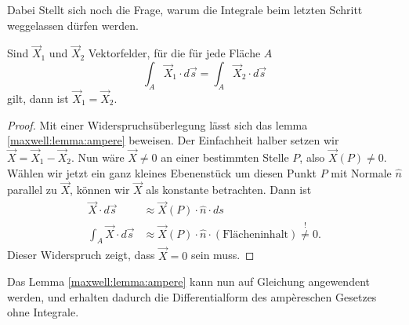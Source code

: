 Dabei Stellt sich noch die Frage, warum die Integrale beim letzten Schritt weggelassen dürfen werden.
\begin{lemma}
	\label{maxwell:lemma:ampere}
	Sind $\vec{X}_1$ und $\vec{X}_2$ Vektorfelder, für die für jede Fläche $A$
	\[
	\int_A \vec{X}_1\cdot d\vec{s}
	=
	\int_A \vec{X}_2\cdot d\vec{s}
	\]
	gilt, dann ist $\vec{X}_1=\vec{X}_2$.
\end{lemma}

\begin{proof}
	\label{maxwell:proof:ampere}
	Mit einer Widerspruchsüberlegung lässt sich das lemma \ref{maxwell:lemma:ampere} beweisen.
	Der Einfachheit halber setzen wir $\vec{X} = \vec{X}_1-\vec{X}_2$.
	Nun wäre $\vec{X} \ne 0$ an einer bestimmten Stelle $P$, also $\vec{X}(P) \ne 0$.
	Wählen wir jetzt ein ganz kleines Ebenenstück um diesen Punkt $P$ mit Normale $\hat{n}$ parallel zu $\vec{X}$, können wir $\vec{X}$ als konstante betrachten. 
	Dann ist
	\begin{align*}
		\vec{X} \cdot d\vec{s} 
		&\approx
		\vec{X}(P) \cdot \hat{n} \cdot ds
		\\
		\int_{A} \vec{X} \cdot d\vec{s}
		&\approx
		\vec{X}(P) \cdot \hat{n} \cdot (\text{Flächeninhalt}) \overset{!}{\ne} 0.
	\end{align*}
	Dieser Widerspruch zeigt, dass $\vec{X} = 0$ sein muss.
\end{proof}
Das Lemma \ref{maxwell:lemma:ampere} kann nun auf Gleichung  angewendent werden, und erhalten dadurch die Differentialform des ampèreschen Gesetzes ohne Integrale.


